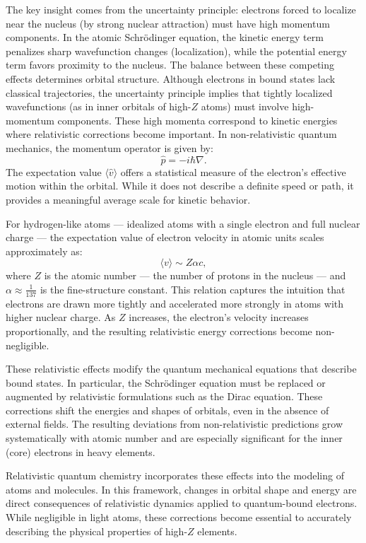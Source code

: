 The key insight comes from the uncertainty principle: electrons forced to localize near the nucleus (by strong nuclear attraction) must have high momentum components. In the atomic Schrödinger equation, the kinetic energy term penalizes sharp wavefunction changes (localization), while the potential energy term favors proximity to the nucleus. The balance between these competing effects determines orbital structure. Although electrons in bound states lack classical trajectories, the uncertainty principle implies that tightly localized wavefunctions (as in inner orbitals of high-$Z$ atoms) must involve high-momentum components. These high momenta correspond to kinetic energies where relativistic corrections become important. In non-relativistic quantum mechanics, the momentum operator is given by:
\[
\hat{p} = -i\hbar \nabla.
\]
The expectation value \( \langle \hat{v} \rangle \) offers a statistical measure of the electron’s effective motion within the orbital. While it does not describe a definite speed or path, it provides a meaningful average scale for kinetic behavior.

For hydrogen-like atoms — idealized atoms with a single electron and full nuclear charge — the expectation value of electron velocity in atomic units scales approximately as:
\[
\langle v \rangle \sim Z\alpha c,
\]
where \( Z \) is the atomic number — the number of protons in the nucleus — and \( \alpha \approx \tfrac{1}{137} \) is the fine-structure constant. This relation captures the intuition that electrons are drawn more tightly and accelerated more strongly in atoms with higher nuclear charge. As \( Z \) increases, the electron’s velocity increases proportionally, and the resulting relativistic energy corrections become non-negligible.

These relativistic effects modify the quantum mechanical equations that describe bound states. In particular, the Schrödinger equation must be replaced or augmented by relativistic formulations such as the Dirac equation. These corrections shift the energies and shapes of orbitals, even in the absence of external fields. The resulting deviations from non-relativistic predictions grow systematically with atomic number and are especially significant for the inner (core) electrons in heavy elements.

Relativistic quantum chemistry incorporates these effects into the modeling of atoms and molecules. In this framework, changes in orbital shape and energy are direct consequences of relativistic dynamics applied to quantum-bound electrons. While negligible in light atoms, these corrections become essential to accurately describing the physical properties of high-$Z$ elements.

